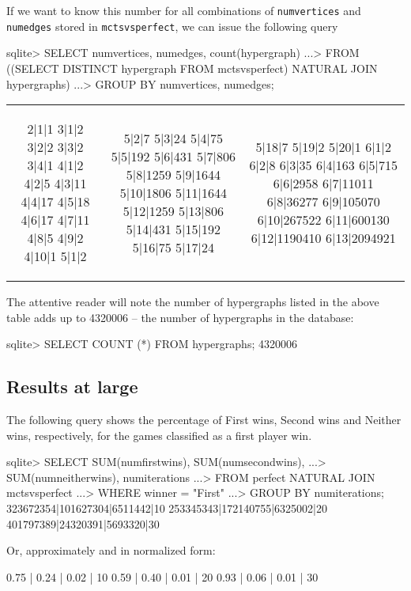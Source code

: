 If we want to know this number for all combinations of \texttt{numvertices} and \texttt{numedges} stored in \texttt{mctsvsperfect}, we can issue the following query
\begin{code}
sqlite> SELECT numvertices, numedges, count(hypergraph)
   ...> FROM ((SELECT DISTINCT hypergraph FROM mctsvsperfect) NATURAL JOIN hypergraphs)
   ...> GROUP BY numvertices, numedges;
\end{code}
\begin{tabular}{|c|c|c|}
\begin{minipage}{1.0in}
\begin{datalisting}
2|1|1
3|1|2
3|2|2
3|3|2
3|4|1
4|1|2
4|2|5
4|3|11
4|4|17
4|5|18
4|6|17
4|7|11
4|8|5
4|9|2
4|10|1
5|1|2
\end{datalisting}
\end{minipage}
&
\begin{minipage}{1.0in}
\begin{datalisting}
5|2|7
5|3|24
5|4|75
5|5|192
5|6|431
5|7|806
5|8|1259
5|9|1644
5|10|1806
5|11|1644
5|12|1259
5|13|806
5|14|431
5|15|192
5|16|75
5|17|24
\end{datalisting}
\end{minipage}
&
\begin{minipage}{1.0in}
\begin{datalisting}
5|18|7
5|19|2
5|20|1
6|1|2
6|2|8
6|3|35
6|4|163
6|5|715
6|6|2958
6|7|11011
6|8|36277
6|9|105070
6|10|267522
6|11|600130
6|12|1190410
6|13|2094921
\end{datalisting}
\end{minipage}
\\
\end{tabular}

The attentive reader will note the number of hypergraphs listed in the above table adds up to 4320006 -- the number of hypergraphs in the database:
\begin{code}
sqlite> SELECT COUNT (*) FROM hypergraphs;
4320006
\end{code}

\subsection{Results at large}

The following query shows the percentage of First wins, Second wins and Neither wins, respectively, for the games classified as a first player win.
\begin{code}
sqlite> SELECT SUM(numfirstwins), SUM(numsecondwins),
   ...>        SUM(numneitherwins), numiterations
   ...> FROM perfect NATURAL JOIN mctsvsperfect
   ...> WHERE winner = "First"
   ...> GROUP BY numiterations;
323672354|101627304|6511442|10
253345343|172140755|6325002|20
401797389|24320391|5693320|30
\end{code}
Or, approximately and in normalized form:
\begin{code}
0.75 | 0.24 | 0.02 | 10
0.59 | 0.40 | 0.01 | 20
0.93 | 0.06 | 0.01 | 30
\end{code}

